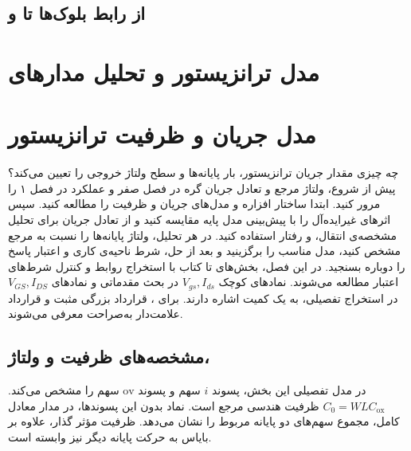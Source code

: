 \section{از رابط بلوک‌ها تا  و }
\label{sec:book-logic-design}






\ifCompleteNotes
\chapter{مدل ترانزیستور  و تحلیل مدارهای }
\else
\chapter{مدل جریان و ظرفیت ترانزیستور }
\fi
\label{chap:mos-theory}
\ifCompleteNotes
چه چیزی مقدار جریان ترانزیستور، بار پایانه‌ها و سطح ولتاژ خروجی را
تعیین می‌کند؟ پیش از شروع، ولتاژ مرجع و تعادل جریان گره در فصل صفر
و عملکرد  در فصل ۱ را مرور کنید. ابتدا ساختار افزاره و
مدل‌های جریان و ظرفیت را مطالعه کنید.
سپس اثرهای غیرایده‌آل را با پیش‌بینی مدل پایه مقایسه کنید و از تعادل
جریان برای تحلیل مشخصه‌ی انتقال،  و رفتار
 استفاده کنید. در هر تحلیل، ولتاژ پایانه‌ها را نسبت به
مرجع مشخص کنید، مدل مناسب را برگزینید و بعد از حل، شرط ناحیه‌ی کاری و
اعتبار پاسخ را دوباره بسنجید.
\else
در این فصل، بخش‌های  تا  کتاب با استخراج روابط و
کنترل شرط‌های اعتبار مطالعه می‌شوند.
\fi
نمادهای کوچک \(V_{gs},I_{ds}\) در بحث
مقدماتی و نمادهای \(V_{GS},I_{DS}\) در استخراج تفصیلی، به یک کمیت اشاره دارند.
برای ، قرارداد بزرگی مثبت و قرارداد علامت‌دار به‌صراحت معرفی می‌شوند.


\section{مشخصه‌های ظرفیت و ولتاژ، }
\label{sec:book-cv}
در مدل تفصیلی این بخش، پسوند \(i\) سهم  و پسوند
\(\mathrm{ov}\) سهم  را مشخص می‌کند.
\(C_0=WLC_{\mathrm{ox}}\) ظرفیت هندسی مرجع است.
نماد بدون این پسوندها، در مدار معادل کامل، مجموع سهم‌های دو پایانه مربوط را
نشان می‌دهد. ظرفیت مؤثر گذار، علاوه بر بایاس به حرکت پایانه دیگر نیز وابسته است.

